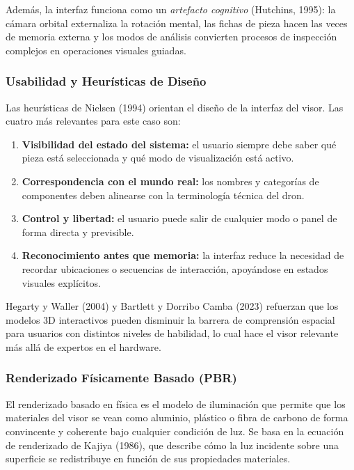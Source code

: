 Adem\'as, la interfaz funciona como un \textit{artefacto cognitivo} (Hutchins, 1995): la c\'amara orbital externaliza la rotaci\'on mental, las fichas de pieza hacen las veces de memoria externa y los modos de an\'alisis convierten procesos de inspecci\'on complejos en operaciones visuales guiadas.

\subsubsection{Usabilidad y Heur\'isticas de Dise\~no}

Las heur\'isticas de Nielsen (1994) orientan el dise\~no de la interfaz del visor. Las cuatro m\'as relevantes para este caso son:

\begin{enumerate}
    \item \textbf{Visibilidad del estado del sistema:} el usuario siempre debe saber qu\'e pieza est\'a seleccionada y qu\'e modo de visualizaci\'on est\'a activo.
    \item \textbf{Correspondencia con el mundo real:} los nombres y categor\'ias de componentes deben alinearse con la terminolog\'ia t\'ecnica del dron.
    \item \textbf{Control y libertad:} el usuario puede salir de cualquier modo o panel de forma directa y previsible.
    \item \textbf{Reconocimiento antes que memoria:} la interfaz reduce la necesidad de recordar ubicaciones o secuencias de interacci\'on, apoy\'andose en estados visuales expl\'icitos.
\end{enumerate}

Hegarty y Waller (2004) y Bartlett y Dorribo Camba (2023) refuerzan que los modelos 3D interactivos pueden disminuir la barrera de comprensi\'on espacial para usuarios con distintos niveles de habilidad, lo cual hace el visor relevante m\'as all\'a de expertos en el hardware.

\subsubsection{Renderizado F\'isicamente Basado (PBR)}

El renderizado basado en f\'isica es el modelo de iluminaci\'on que permite que los materiales del visor se vean como aluminio, pl\'astico o fibra de carbono de forma convincente y coherente bajo cualquier condici\'on de luz. Se basa en la ecuaci\'on de renderizado de Kajiya (1986), que describe c\'omo la luz incidente sobre una superficie se redistribuye en funci\'on de sus propiedades materiales.

